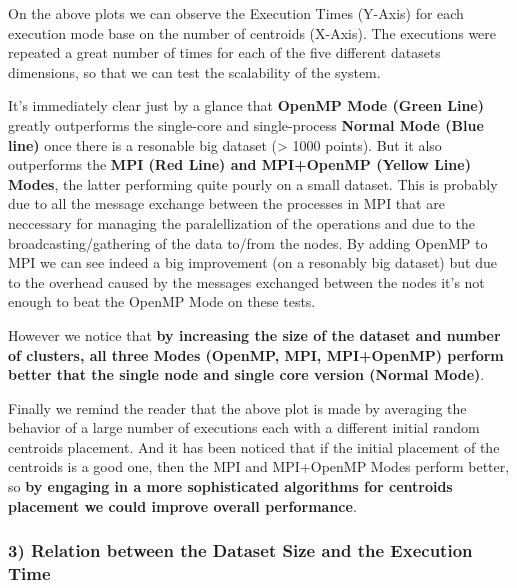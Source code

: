 \documentclass[11pt]{article}
\begin{document}
On the above plots we can observe the Execution Times (Y-Axis) for each
execution mode base on the number of centroids (X-Axis). The executions
were repeated a great number of times for each of the five different
datasets dimensions, so that we can test the scalability of the system.

It's immediately clear just by a glance that \textbf{OpenMP Mode (Green
Line)} greatly outperforms the single-core and single-process
\textbf{Normal Mode (Blue line)} once there is a resonable big dataset
(\textgreater{} 1000 points). But it also outperforms the \textbf{MPI
(Red Line) and MPI+OpenMP (Yellow Line) Modes}, the latter performing
quite pourly on a small dataset. This is probably due to all the message
exchange between the processes in MPI that are neccessary for managing
the paralellization of the operations and due to the
broadcasting/gathering of the data to/from the nodes. By adding OpenMP
to MPI we can see indeed a big improvement (on a resonably big dataset)
but due to the overhead caused by the messages exchanged between the
nodes it's not enough to beat the OpenMP Mode on these tests.

However we notice that \textbf{by increasing the size of the dataset and
number of clusters, all three Modes (OpenMP, MPI, MPI+OpenMP) perform
better that the single node and single core version (Normal Mode)}.

Finally we remind the reader that the above plot is made by averaging
the behavior of a large number of executions each with a different
initial random centroids placement. And it has been noticed that if the
initial placement of the centroids is a good one, then the MPI and
MPI+OpenMP Modes perform better, so \textbf{by engaging in a more
sophisticated algorithms for centroids placement we could improve
overall performance}.

    \hypertarget{relation-between-the-dataset-size-and-the-execution-time}{%
\subsubsection{3) Relation between the Dataset Size and the Execution
Time}\label{relation-between-the-dataset-size-and-the-execution-time}}
\end{document}
